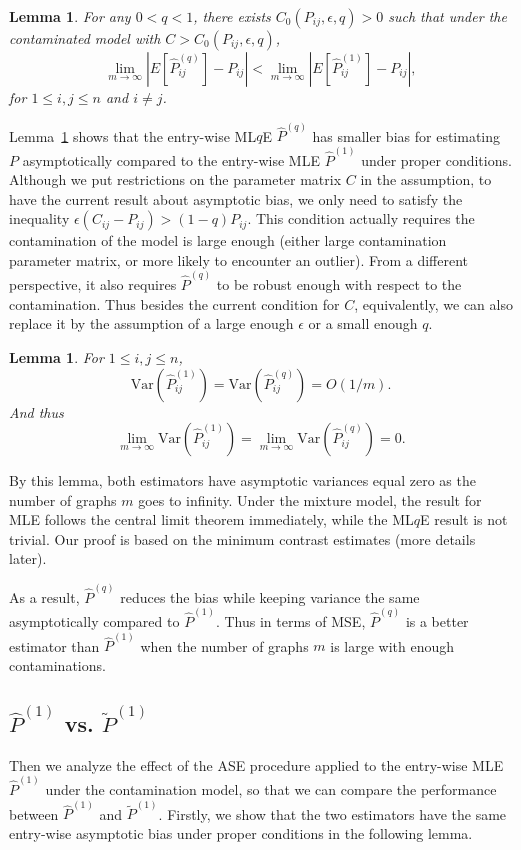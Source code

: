 \documentclass[a4paper]{article}
\newtheorem{lemma}[fact]{Lemma}
\renewcommand{\hat}{\widehat}
\begin{document}
\begin{lemma}
\label{lemma:ELqlEMLE}
For any $0 < q < 1$, there exists $C_0(P_{ij}, \epsilon, q) > 0$ such that under the contaminated model with $C > C_0(P_{ij}, \epsilon, q)$,
\[
	\lim_{m \to \infty} \left| E[\hat{P}^{(q)}_{ij}] - P_{ij} \right| < 
    \lim_{m \to \infty} \left| E[\hat{P}^{(1)}_{ij}] - P_{ij} \right|,
\]
for $1 \le i, j \le n$ and $i \ne j$.
\end{lemma}

Lemma~\ref{lemma:ELqlEMLE} shows that the entry-wise ML$q$E $\hat{P}^{(q)}$ has smaller bias for estimating $P$ asymptotically compared to the entry-wise MLE $\hat{P}^{(1)}$ under proper conditions. Although we put restrictions on the parameter matrix $C$ in the assumption, to have the current result about asymptotic bias, we only need to satisfy the inequality $\epsilon (C_{ij} - P_{ij}) > (1 - q) P_{ij}$. This condition actually requires the contamination of the model is large enough (either large contamination parameter matrix, or more likely to encounter an outlier). From a different perspective, it also requires $\hat{P}^{(q)}$ to be robust enough with respect to the contamination. Thus besides the current condition for $C$, equivalently, we can also replace it by the assumption of a large enough $\epsilon$ or a small enough $q$.

\begin{lemma}
\label{lemma:VarLqlVarMLE}
For $1 \le i, j \le n$, 
\[
	\mathrm{Var}(\hat{P}^{(1)}_{ij})
    = \mathrm{Var}(\hat{P}^{(q)}_{ij}) = O(1/m).
\]
And thus
\[
	\lim_{m \to \infty} \mathrm{Var}(\hat{P}^{(1)}_{ij})
    = \lim_{m \to \infty} \mathrm{Var}(\hat{P}^{(q)}_{ij}) = 0.
\]
\end{lemma}

By this lemma, both estimators have asymptotic variances equal zero as the number of graphs $m$ goes to infinity. Under the mixture model, the result for MLE follows the central limit theorem immediately, while the ML$q$E result is not trivial. Our proof is based on the minimum contrast estimates (more details later).

As a result, $\hat{P}^{(q)}$ reduces the bias while keeping variance the same asymptotically compared to $\hat{P}^{(1)}$. Thus in terms of MSE, $\hat{P}^{(q)}$ is a better estimator than $\hat{P}^{(1)}$ when the number of graphs $m$ is large with enough contaminations.

\subsection{$\hat{P}^{(1)}$ vs. $\widetilde{P}^{(1)}$}
Then we analyze the effect of the ASE procedure applied to the entry-wise MLE $\hat{P}^{(1)}$ under the contamination model, so that we can compare the performance between $\hat{P}^{(1)}$ and $\widetilde{P}^{(1)}$.
Firstly, we show that the two estimators have the same entry-wise asymptotic bias under proper conditions in the following lemma.
\end{document}
